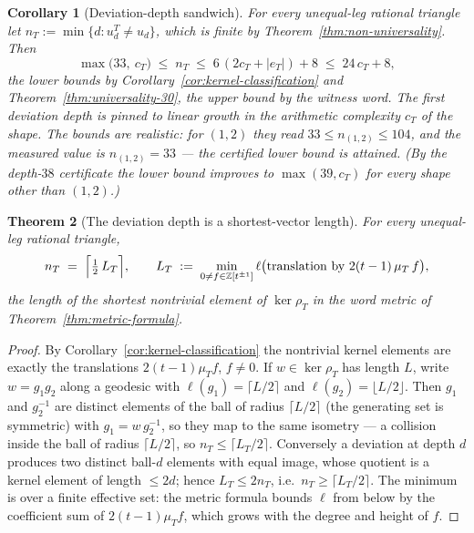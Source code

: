 \documentclass[11pt,a4paper]{article}
\newtheorem{theorem}{Theorem}
\newtheorem{corollary}[theorem]{Corollary}
\theoremstyle{remark}
\theoremstyle{plain}
\begin{document}
\begin{corollary}[Deviation-depth sandwich]
\label{cor:sandwich}
For every unequal-leg rational triangle let
$n_T := \min\{d : u_d^T \neq u_d\}$, which is finite by
Theorem~\ref{thm:non-universality}.  Then
\[
\max\bigl(33,\ c_T\bigr) \;\le\; n_T \;\le\;
6\,(2c_T + |e_T|) + 8 \;\le\; 24\,c_T + 8,
\]
the lower bounds by Corollary~\ref{cor:kernel-classification} and
Theorem~\ref{thm:universality-30}, the upper bound by the witness
word.  The first deviation depth is pinned to linear growth in the
arithmetic complexity $c_T$ of the shape.  The bounds are realistic:
for $(1,2)$ they read $33 \le n_{(1,2)} \le 104$, and the measured
value is $n_{(1,2)} = 33$ --- the certified lower bound is attained.
(By the depth-$38$ certificate the lower bound improves to
$\max(39, c_T)$ for every shape other than $(1,2)$.)
\end{corollary}

\begin{theorem}[The deviation depth is a shortest-vector length]
\label{thm:midpoint}
For every unequal-leg rational triangle,
\[
n_T \;=\; \Bigl\lceil \tfrac{1}{2}\, L_T \Bigr\rceil,
\qquad
L_T \;:=\; \min_{0 \neq f \in \mathbb{Z}[t^{\pm 1}]}
\ell\bigl(\text{translation by } 2(t-1)\,\mu_T\, f\bigr),
\]
the length of the shortest nontrivial element of $\ker \rho_T$ in the
word metric of Theorem~\ref{thm:metric-formula}.
\end{theorem}

\begin{proof}
By Corollary~\ref{cor:kernel-classification} the nontrivial kernel
elements are exactly the translations $2(t-1)\mu_T f$, $f \neq 0$.
If $w \in \ker\rho_T$ has length $L$, write $w = g_1 g_2$ along a
geodesic with $\ell(g_1) = \lceil L/2 \rceil$ and
$\ell(g_2) = \lfloor L/2 \rfloor$.  Then $g_1$ and $g_2^{-1}$ are
distinct elements of the ball of radius $\lceil L/2 \rceil$ (the
generating set is symmetric) with $g_1 = w\, g_2^{-1}$, so they map to
the same isometry --- a collision inside the ball of radius
$\lceil L/2 \rceil$, so $n_T \le \lceil L_T/2 \rceil$.  Conversely a
deviation at depth $d$ produces two distinct ball-$d$ elements with
equal image, whose quotient is a kernel element of length $\le 2d$;
hence $L_T \le 2 n_T$, i.e.\ $n_T \ge \lceil L_T/2 \rceil$.  The
minimum is over a finite effective set: the metric formula bounds
$\ell$ from below by the coefficient sum of $2(t-1)\mu_T f$, which
grows with the degree and height of $f$.
\end{proof}
\end{document}

